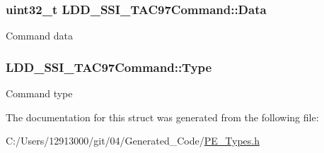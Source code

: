 \subsubsection[{Data}]{\setlength{\rightskip}{0pt plus 5cm}uint32\+\_\+t L\+D\+D\+\_\+\+S\+S\+I\+\_\+\+T\+A\+C97\+Command\+::\+Data}\label{struct_l_d_d___s_s_i___t_a_c97_command_abc16535d09d61f2c3f885adf91632117}
Command data \hypertarget{struct_l_d_d___s_s_i___t_a_c97_command_ac7226beaf57a764f71faf7e822e27a6e}{}
\subsubsection[{Type}]{ L\+D\+D\+\_\+\+S\+S\+I\+\_\+\+T\+A\+C97\+Command\+::\+Type}\label{struct_l_d_d___s_s_i___t_a_c97_command_ac7226beaf57a764f71faf7e822e27a6e}
Command type 

The documentation for this struct was generated from the following file\+:\begin{DoxyCompactItemize}
\item 
C\+:/\+Users/12913000/git/04/\+Generated\+\_\+\+Code/\hyperlink{_p_e___types_8h}{P\+E\+\_\+\+Types.\+h}\end{DoxyCompactItemize}
